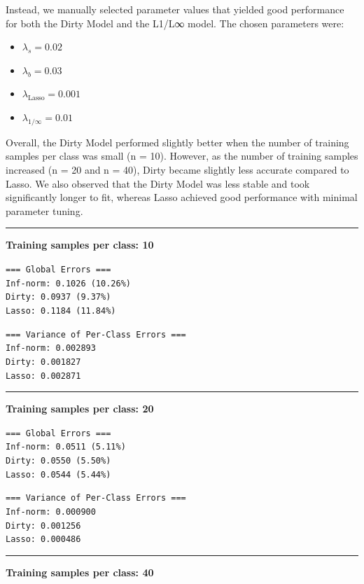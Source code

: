 \documentclass{article}
\begin{document}
Instead, we manually selected parameter values that yielded good performance for both the Dirty Model and the L1/L∞ model.
The chosen parameters were:
\begin{itemize}
    \item $\lambda_s = 0.02$
    \item $\lambda_b = 0.03$
    \item $\lambda_{\text{Lasso}} = 0.001$
    \item $\lambda_{1/\infty} = 0.01$
\end{itemize}
Overall, the Dirty Model performed slightly better when the number of training samples per class was small (n = 10). However, as the number of training samples increased (n = 20 and n = 40), Dirty became slightly less accurate compared to Lasso.
We also observed that the Dirty Model was less stable and took significantly longer to fit, whereas Lasso achieved good performance with minimal parameter tuning.

\bigskip
\hrule
\bigskip

\textbf{Training samples per class: 10}

\texttt{=== Global Errors ===} \\
\texttt{Inf-norm:  0.1026 (10.26\%)} \\
\texttt{Dirty:     0.0937 (9.37\%)} \\
\texttt{Lasso:     0.1184 (11.84\%)}

\texttt{=== Variance of Per-Class Errors ===} \\
\texttt{Inf-norm:  0.002893} \\
\texttt{Dirty:     0.001827} \\
\texttt{Lasso:     0.002871}

\bigskip
\hrule
\bigskip

\textbf{Training samples per class: 20}

\texttt{=== Global Errors ===} \\
\texttt{Inf-norm:  0.0511 (5.11\%)} \\
\texttt{Dirty:     0.0550 (5.50\%)} \\
\texttt{Lasso:     0.0544 (5.44\%)}

\texttt{=== Variance of Per-Class Errors ===} \\
\texttt{Inf-norm:  0.000900} \\
\texttt{Dirty:     0.001256} \\
\texttt{Lasso:     0.000486}


\bigskip
\hrule
\bigskip

\textbf{Training samples per class: 40}
\end{document}
